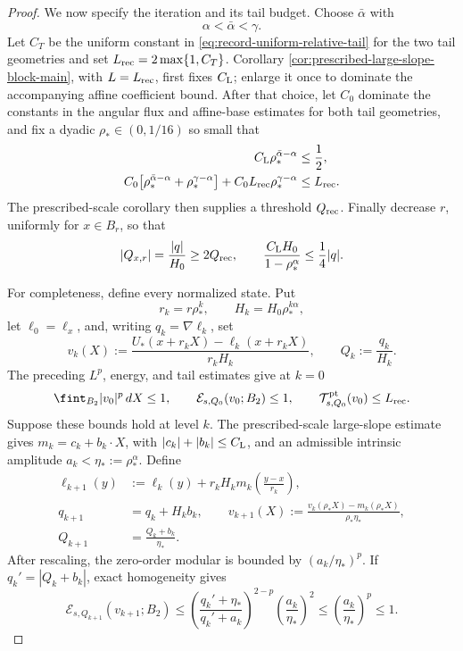 \documentclass[11pt,reqno]{amsart}
\numberwithin{equation}{section}
\newcommand{\dd}{\,d}
\theoremstyle{remark}
\begin{document}
\begin{proof}
We now specify the iteration and its tail budget.  Choose
\(\bar\alpha\) with
\[
 \alpha<\bar\alpha<\gamma.
\]
Let \(C_T\) be the uniform constant in
\eqref{eq:record-uniform-relative-tail} for the two tail geometries and
set \(L_{\rm rec}=2\max\{1,C_T\}\).  Corollary
\ref{cor:prescribed-large-slope-block-main}, with
\(L=L_{\rm rec}\), first fixes \(C_{\rm L}\); enlarge it once to
dominate the accompanying affine coefficient bound.  After that
choice, let \(C_0\) dominate the constants in the angular flux and
affine-base estimates for both tail geometries, and fix
a dyadic \(\rho_*\in(0,1/16)\) so small that
\begin{align}
 C_{\rm L}\rho_*^{\bar\alpha-\alpha}&\le\frac12,
 \label{eq:record-iteration-endpoint}\\
 C_0\bigl[\rho_*^{\bar\alpha-\alpha}
          +\rho_*^{\gamma-\alpha}\bigr]
 +C_0L_{\rm rec}\rho_*^{\gamma-\alpha}
 &\le L_{\rm rec}.
 \label{eq:record-iteration-tail-budget}
\end{align}
The prescribed-scale corollary then supplies a threshold \(Q_{\rm rec}\).
Finally decrease \(r\), uniformly for \(x\in B_r\), so that
\begin{equation}
 |Q_{x,r}|=\frac{|q|}{H_0}\ge2Q_{\rm rec},
 \qquad
 \frac{C_{\rm L}H_0}{1-\rho_*^\alpha}\le\frac14|q|.
 \label{eq:record-slope-stability}
\end{equation}

For completeness, define every normalized state.  Put
\[
 r_k=r\rho_*^k,\qquad H_k=H_0\rho_*^{k\alpha},
\]
let \(\ell_0=\ell_x\), and, writing \(q_k=\nabla\ell_k\), set
\begin{equation}
 v_k(X):=
 \frac{U_*(x+r_kX)-\ell_k(x+r_kX)}{r_kH_k},
 \qquad Q_k:=\frac{q_k}{H_k}.
 \label{eq:record-explicit-normalized-state}
\end{equation}
The preceding \(L^p\), energy, and tail estimates give at \(k=0\)
\[
 \fint_{B_2}|v_0|^p\dd X\le1,\qquad
 \mathcal E_{s,Q_0}(v_0;B_2)\le1,\qquad
 \mathcal T^{\rm pt}_{s,Q_0}(v_0)\le L_{\rm rec}.
\]
Suppose these bounds hold at level \(k\).  The prescribed-scale
large-slope estimate gives \(m_k=c_k+b_k\cdot X\), with
\(|c_k|+|b_k|\le C_{\rm L}\), and an admissible intrinsic amplitude
\(a_k<\eta_*:=\rho_*^\alpha\).  Define
\begin{align*}
 \ell_{k+1}(y)
 &:=\ell_k(y)+r_kH_k
 m_k\left(\frac{y-x}{r_k}\right),\\
 q_{k+1}&=q_k+H_kb_k,\qquad
 v_{k+1}(X)
 :=\frac{v_k(\rho_*X)-m_k(\rho_*X)}
 {\rho_*\eta_*},\\
 Q_{k+1}&=\frac{Q_k+b_k}{\eta_*}.
\end{align*}
After rescaling, the zero-order modular is bounded by
\((a_k/\eta_*)^p\).  If \(q_k'=|Q_k+b_k|\), exact homogeneity gives
\[
 \mathcal E_{s,Q_{k+1}}(v_{k+1};B_2)
 \le
 \left(\frac{q_k'+\eta_*}{q_k'+a_k}\right)^{2-p}
 \left(\frac{a_k}{\eta_*}\right)^2
 \le\left(\frac{a_k}{\eta_*}\right)^p\le1.
\]


\end{proof}
\end{document}
